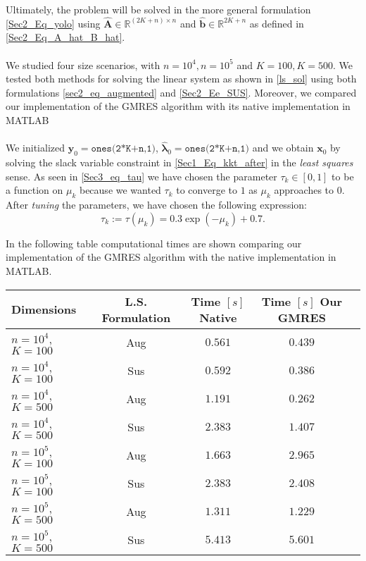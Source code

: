 Ultimately, the problem will be solved in the more general formulation \ref{Sec2_Eq_yolo} using $\hat{\mathbf{A}}\in \mathbb{R}^{(2K + n)\times n}$ and $\hat{\bm{b}}\in \mathbb{R}^{2K + n}$ as defined in \ref{Sec2_Eq_A_hat_B_hat}.\\
\\
\noindent We studied four size scenarios, with $n=10^4, n=10^5$ and $K=100, K=500$. We tested both methods for solving the linear system as shown in \ref{ls_sol} using both formulations \ref{sec2_eq_augmented} and \ref{Sec2_Ee_SUS}. Moreover, we compared our implementation of the GMRES algorithm with its native implementation in MATLAB\\
\\
\noindent We initialized $\bm{y}_0 = \texttt{ones(2*K+n,1)}$, $ \hat{\bm{\lambda}}_0 = \texttt{ones(2*K+n,1)}$ and we obtain $\bm{x}_0$ by solving the slack variable constraint in \eqref{Sec1_Eq_kkt_after} in the \textit{least squares} sense. As seen in  \eqref{Sec3_eq_tau} we have chosen the parameter $\tau_k \in [0,1]$ to be a function on $\mu_k$ because we wanted $\tau_k$ to converge to $1$ as $\mu_k$ approaches to 0. After  \textit{tuning} the parameters, we have chosen the following expression:
\begin{equation}
    \tau_k := \tau(\mu_k) = 0.3 \exp{(-\mu_k)} + 0.7.
\end{equation}

In the following table computational times are shown comparing our implementation of the GMRES algorithm with the native implementation in MATLAB.
{\begin{center}
    \begin{tabular}{|l|c|c|c|r|}
     \hline Dimensions & L.S. Formulation &Time $[s]$ Native & Time $[s]$ Our GMRES \\
       \hline    
       $ n=10^4$, $K=100$ & Aug & $ 0.561$ &$0.439$  \\
       \hline
       $ n=10^4$, $K=100$ & Sus & $ 0.592$ &$0.386$  \\
       \hline
       $ n=10^4$, $K=500$ & Aug & $ 1.191$ &$0.262$  \\
       \hline
       $ n=10^4$, $K=500$ & Sus & $ 2.383$ &$1.407$  \\
       \hline
       $ n=10^5$, $K=100$ & Aug & $ 1.663$ &$2.965$  \\
       \hline
       $ n=10^5$, $K=100$ & Sus & $ 2.383$ &$2.408$  \\
       \hline
       $ n=10^5$, $K=500$ & Aug & $ 1.311$ &$1.229$  \\
       \hline
       $ n=10^5$, $K=500$ & Sus & $ 5.413$ &$5.601$  \\
       \hline
  \end{tabular}
\end{center}}